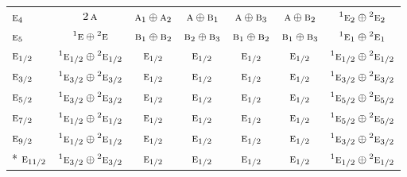 \documentclass[10pt,a4paper]{article}
\numberwithin{equation}{section}
\newcommand{\irr}[1]{\text{\normalfont\scshape #1}}
\newcommand{\conjpair}[1]{{}^{#1}}
\begin{document}
{\begin{longtable}{@{}lcccccc@{}}
$\irr{e}_{4}$ & $2\,\irr{a}$ & $\irr{a}_{1}\oplus \irr{a}_{2}$ & $\irr{a}\oplus \irr{b}_{1}$ & $\irr{a}\oplus \irr{b}_{3}$ & $\irr{a}\oplus \irr{b}_{2}$ & $\conjpair{1}\irr{e}_{2}\oplus \conjpair{2}\irr{e}_{2}$\\
$\irr{e}_{5}$ & $\conjpair{1}\irr{e}\oplus \conjpair{2}\irr{e}$ & $\irr{b}_{1}\oplus \irr{b}_{2}$ & $\irr{b}_{2}\oplus \irr{b}_{3}$ & $\irr{b}_{1}\oplus \irr{b}_{2}$ & $\irr{b}_{1}\oplus \irr{b}_{3}$ & $\conjpair{1}\irr{e}_{1}\oplus \conjpair{2}\irr{e}_{1}$\\
$\irr{e}_{1/2}$ & $\conjpair{1}\irr{e}_{1/2}\oplus \conjpair{2}\irr{e}_{1/2}$ & $\irr{e}_{1/2}$ & $\irr{e}_{1/2}$ & $\irr{e}_{1/2}$ & $\irr{e}_{1/2}$ & $\conjpair{1}\irr{e}_{1/2}\oplus \conjpair{2}\irr{e}_{1/2}$\\
$\irr{e}_{3/2}$ & $\conjpair{1}\irr{e}_{3/2}\oplus \conjpair{2}\irr{e}_{3/2}$ & $\irr{e}_{1/2}$ & $\irr{e}_{1/2}$ & $\irr{e}_{1/2}$ & $\irr{e}_{1/2}$ & $\conjpair{1}\irr{e}_{3/2}\oplus \conjpair{2}\irr{e}_{3/2}$\\
$\irr{e}_{5/2}$ & $\conjpair{1}\irr{e}_{3/2}\oplus \conjpair{2}\irr{e}_{3/2}$ & $\irr{e}_{1/2}$ & $\irr{e}_{1/2}$ & $\irr{e}_{1/2}$ & $\irr{e}_{1/2}$ & $\conjpair{1}\irr{e}_{5/2}\oplus \conjpair{2}\irr{e}_{5/2}$\\
$\irr{e}_{7/2}$ & $\conjpair{1}\irr{e}_{1/2}\oplus \conjpair{2}\irr{e}_{1/2}$ & $\irr{e}_{1/2}$ & $\irr{e}_{1/2}$ & $\irr{e}_{1/2}$ & $\irr{e}_{1/2}$ & $\conjpair{1}\irr{e}_{5/2}\oplus \conjpair{2}\irr{e}_{5/2}$\\
$\irr{e}_{9/2}$ & $\conjpair{1}\irr{e}_{1/2}\oplus \conjpair{2}\irr{e}_{1/2}$ & $\irr{e}_{1/2}$ & $\irr{e}_{1/2}$ & $\irr{e}_{1/2}$ & $\irr{e}_{1/2}$ & $\conjpair{1}\irr{e}_{3/2}\oplus \conjpair{2}\irr{e}_{3/2}$\\*
$\irr{e}_{11/2}$ & $\conjpair{1}\irr{e}_{3/2}\oplus \conjpair{2}\irr{e}_{3/2}$ & $\irr{e}_{1/2}$ & $\irr{e}_{1/2}$ & $\irr{e}_{1/2}$ & $\irr{e}_{1/2}$ & $\conjpair{1}\irr{e}_{1/2}\oplus \conjpair{2}\irr{e}_{1/2}$\\
\bottomrule\end{longtable}}
\end{document}
